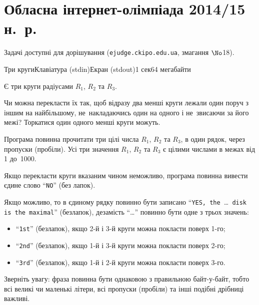 \documentclass[14pt,a4paper]{extarticle}
\begin{document}

\section{Обласна інтернет-олімпіада 2014/15 н.~р.}

Задачі доступні для дорішування (\verb"ejudge.ckipo.edu.ua", змагання $\No$18).

\renewenvironment{problemAllDefault}[1]{\vspace{10mm}\par\begin{problem}{#1}{Клавіатура (stdin)}{Екран (stdout)}{1 сек}{64 мегабайти}}{\end{problem}}

\begin{problemAllDefault}{Три круги}

Є три круги радіусами $R_1$, $R_2$ та $R_3$.

Чи можна перекласти їх так, щоб відразу два менші круги лежали один поруч з іншим на найбільшому, не~накладаючись один на одного і не~звисаючи за його межі? Торкатися один одного менші круги можуть.

\InputFile  Програма повинна прочитати три цілі числа $R_1$, $R_2$ та $R_3$, в один рядок, через пропуски (пробіли). Усі три значення $R_1$, $R_2$ та $R_3$ є цілими числами в межах від 1 до~1000.

\OutputFile Якщо перекласти круги вказаним чином неможливо, програма повинна вивести єдине слово ``\texttt{NO}'' (без лапок).

Якщо можливо, то в єдиному рядку повинно бути записано ``\texttt{YES, the }\dots{}\texttt{ disk is the maximal}'' (без\nolinebreak[3] лапок), де\nolinebreak[3] замість ``\dots'' повинно бути одне з трьох значень:

\begin{itemize}
\item
``\texttt{1st}'' (без\nolinebreak[3] лапок), якщо 2-й і 3-й круги можна покласти поверх 1-го;
\item
``\texttt{2nd}'' (без\nolinebreak[3] лапок), якщо 1-й і 3-й круги можна покласти поверх 2-го;
\item
``\texttt{3rd}'' (без\nolinebreak[3] лапок), якщо 1-й і 2-й круги можна покласти поверх 3-го.
\end{itemize}

Зверніть увагу: фраза повинна бути однаковою з правильною байт-у-байт, тобто всі великі чи маленькі літери, всі пропуски (пробіли) та інші подібні дрібниці важливі.


\Examples
\begin{exampleSimple}{5em}{16em}%
%
%
%
\end{exampleSimple}


\end{problemAllDefault}
	
\end{document}
